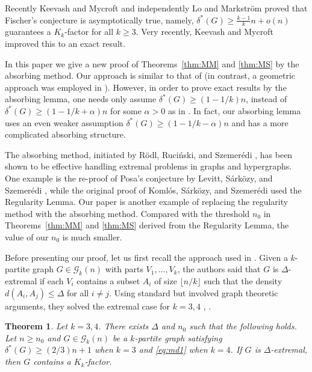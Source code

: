 \documentclass[reqno]{amsart}
\newtheorem{theorem}{Theorem}
\theoremstyle{plain}
\def\a{\alpha}
\def\G{\mathcal{G}}
\begin{document}
Recently Keevash and Mycroft \cite{KeMy} and independently Lo and Markstr\"{o}m \cite{LoMa} proved that Fischer's conjecture is asymptotically  true, namely, $\delta^*(G)\ge \frac{k-1}{k}n + o(n)$ guarantees a $K_k$-factor for all $k\ge 3$. Very recently, Keevash and Mycroft \cite{KeMy2} improved this to an exact result. %


In this paper we give a new proof of Theorems~\ref{thm:MM} and \ref{thm:MS} by the absorbing method.  Our approach is similar to that of \cite{LoMa} (in contrast, a geometric approach was employed in \cite{KeMy}). However, in order to prove exact results by the absorbing lemma, one needs only assume $\delta^*(G)\ge (1 - 1/k)n$, instead of  $\delta^*(G)\ge (1 - 1/k + \a)n$ for some $\a > 0$ as in \cite{LoMa}. In fact, our absorbing lemma uses an even weaker assumption $\delta^*(G)\ge (1 - 1/k - \a)n$ and has a more complicated absorbing structure.

The absorbing method, initiated by R\"odl, Ruci\'nski, and Szemer\'edi \cite{RRS-di}, has been shown to be effective handling extremal problems in graphs and hypergraphs. One example is the re-proof of Posa's conjecture by Levitt, S\'ark\"ozy, and Szemer\'edi \cite{LSS}, while the original  proof of Koml\'os, S\'ark\"ozy, and Szemer\'edi \cite{KSS-posa} used the Regularity Lemma. Our paper is another example of replacing the regularity method with the absorbing method. Compared with the threshold $n_0$ in Theorems~\ref{thm:MM} and \ref{thm:MS} derived from the Regularity Lemma, the value of our $n_0$ is much smaller.

Before presenting our proof, let us first recall the approach used in \cite{MaMa, MaSz}. Given a $k$-partite graph $G\in \G_k(n)$ with parts $V_1, \dots, V_k$, the authors said that $G$ is $\Delta$-extremal if each $V_i$ contains a subset $A_i$ of size $\lfloor n/k \rfloor$ such that the density $d(A_i, A_j) \le \Delta$ for all $i\ne j$. Using standard but involved graph theoretic arguments, they solved the extremal case for $k=3, 4$ \cite[Theorem 3.1]{MaMa}, \cite[Theorem 2.1]{MaSz}.

\begin{theorem}
\label{thm:ext}
Let $k=3, 4$. There exists $\Delta$ and $n_0$ such that the following holds. Let $n\ge n_0$ and $G\in \G_k(n)$ be a $k$-partite graph satisfying ${\delta}^*(G)\ge (2/3)n+1$ when $k=3$ and \eqref{eq:md1} when $k=4$.  If $G$ is $\Delta$-extremal, then $G$ contains a $K_k$-factor.
 \end{theorem}
\end{document}
